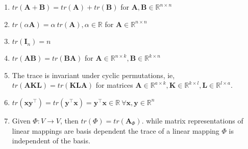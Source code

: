 \begin{enumerate}
    \item $tr(\bm{A} + \bm{B}) = tr(\bm{A}) + tr(\bm{B})$ for $\bm{A}, \bm{B} \in \mathbb{R}^{n\times n}$
    \hfill \cite{mfml/book/mml/Deisenroth-Faisal-Ong}

    \item $tr(\alpha \bm{A}) = \alpha\ tr(\bm{A}), \alpha \in \mathbb{R}$ for $\bm{A} \in \mathbb{R}^{n\times n}$
    \hfill \cite{mfml/book/mml/Deisenroth-Faisal-Ong}
    
    \item $tr(\bm{I}_n) = n$
    \hfill \cite{mfml/book/mml/Deisenroth-Faisal-Ong}
    
    \item $tr(\bm{AB}) = tr(\bm{BA})$ for $\bm{A} \in \mathbb{R}^{n\times k}, \bm{B} \in \mathbb{R}^{k\times n}$
    \hfill \cite{mfml/book/mml/Deisenroth-Faisal-Ong}

    \item The trace is invariant under cyclic permutations, ie, $tr(\bm{AKL}) = tr(\bm{KLA})$ for matrices $\bm{A} \in  \mathbb{R}^{a \times k}, \bm{K} \in  \mathbb{R}^{k \times l}, \bm{L} \in  \mathbb{R}^{l \times a}$. 
    \hfill \cite{mfml/book/mml/Deisenroth-Faisal-Ong}

    \item $
        tr(\bm{xy}^\top) = tr(\bm{y} ^\top \bm{x}) = \bm{y} ^\top \bm{x} \in \mathbb{R}\ 
        \forall \bm{x}, \bm{y} \in \mathbb{R}^n
    $
    \hfill \cite{mfml/book/mml/Deisenroth-Faisal-Ong}

    \item Given $\Phi : V \to V$, then $tr(\Phi) = tr(\bm{A}_\Phi)$. while matrix representations of linear mappings are basis dependent the trace of a linear mapping $\Phi$ is independent of the basis.
    \hfill \cite{mfml/book/mml/Deisenroth-Faisal-Ong}
\end{enumerate}







